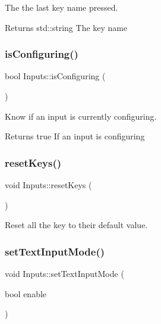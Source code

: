 The the last key name pressed. 

\begin{DoxyReturn}{Returns}
std\+::string The key name 
\end{DoxyReturn}
\mbox{\label{class_inputs_a95f184338486ddfa3a59ff1d993d3e61}} 
\subsubsection{\texorpdfstring{is\+Configuring()}{isConfiguring()}}
{\footnotesize\ttfamily bool Inputs\+::is\+Configuring (\begin{DoxyParamCaption}{ }\end{DoxyParamCaption})\hspace{0.3cm}{\ttfamily [static]}}



Know if an input is currently configuring. 

\begin{DoxyReturn}{Returns}
true If an input is configuring 
\end{DoxyReturn}
\mbox{\label{class_inputs_aedb25df0e00a0b99b691a57746868393}} 
\subsubsection{\texorpdfstring{reset\+Keys()}{resetKeys()}}
{\footnotesize\ttfamily void Inputs\+::reset\+Keys (\begin{DoxyParamCaption}{ }\end{DoxyParamCaption})\hspace{0.3cm}{\ttfamily [static]}}

Reset all the key to their default value. \mbox{\label{class_inputs_a154c7590c8ad9d4be127fcf5a0a392f1}} 
\subsubsection{\texorpdfstring{set\+Text\+Input\+Mode()}{setTextInputMode()}}
{\footnotesize\ttfamily void Inputs\+::set\+Text\+Input\+Mode (\begin{DoxyParamCaption}\item[{bool}]{enable }\end{DoxyParamCaption})\hspace{0.3cm}{\ttfamily [static]}}



